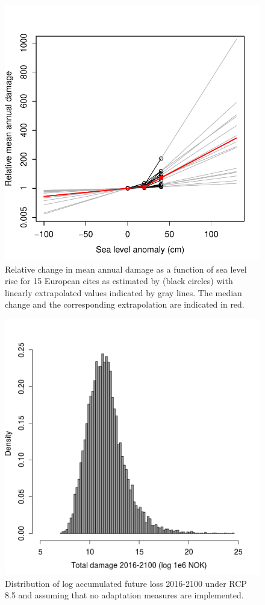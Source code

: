 \documentclass[draft,linenumbers]{agujournal}
\begin{document}
\begin{figure}[!hbpt]
\begin{center}
\includegraphics[width=0.5\linewidth]{EuropeanIncreaseLossExtrapolationUncertainty.pdf}
\caption{ Relative change in mean annual damage as a function of sea level rise for 15 European cites as estimated by \cite{Hallegatte&2013} (black circles) with linearly extrapolated values indicated by gray lines. The median change and the corresponding extrapolation are indicated in red.}
\label{fig:ChangeInDamage}
\end{center}
\end{figure}


\begin{figure}[!hbpt]
\begin{center}
\includegraphics[width=\linewidth]{AccumulatedFutureLoss.png}
\caption{Distribution of log  accumulated future loss 2016-2100 under RCP 8.5 and assuming that no adaptation measures are implemented.} 
\label{fig:NoAction}
\end{center}
\end{figure}
\end{document}
